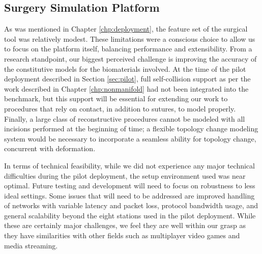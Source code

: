 \subsection{Surgery Simulation Platform}

As was mentioned in Chapter \ref{chp:deployment}, the feature set of
the surgical tool was relatively modest. These limitations were a
conscious choice to allow us to focus on the platform itself,
balancing performance and extensibility. From a research standpoint,
our biggest perceived challenge is improving the accuracy of the
constitutive models for the biomaterials involved. At the time of the
pilot deployment described in Section \ref{sec:pilot}, full
self-collision support as per the work described in Chapter
\ref{chp:nonmanifold} had not been integrated into the benchmark, but
this support will be essential for extending our work to procedures
that rely on contact, in addition to sutures, to model
properly. Finally, a large class of reconstructive procedures cannot
be modeled with all incisions performed at the beginning of time; a
flexible topology change modeling system would be necessary to
incorporate a seamless ability for topology change, concurrent with
deformation.

In terms of technical feasibility, while we did not experience any
major technical difficulties during the pilot deployment, the setup
environment used was near optimal. Future testing and development will
need to focus on robustness to less ideal settings. Some issues that
will need to be addressed are improved handling of networks with
variable latency and packet loss, protocol bandwidth usage, and
general scalability beyond the eight stations used in the pilot
deployment. While these are certainly major challenges, we feel they
are well within our grasp as they have similarities with other fields
such as multiplayer video games and media streaming. 

